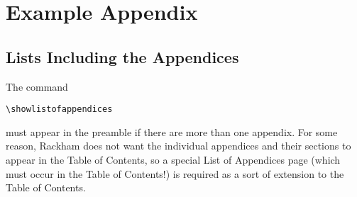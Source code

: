 \chapter{Example Appendix}

\section{Lists Including the Appendices}
The command 
\begin{verbatim}
\showlistofappendices
\end{verbatim} 
must appear in the preamble if there are more than one appendix.  For
some reason, Rackham does not want the individual appendices and their
sections to appear in the Table of Contents, so a special List of
Appendices page (which must occur in the Table of Contents!) is required
as a sort of extension to the Table of Contents.

